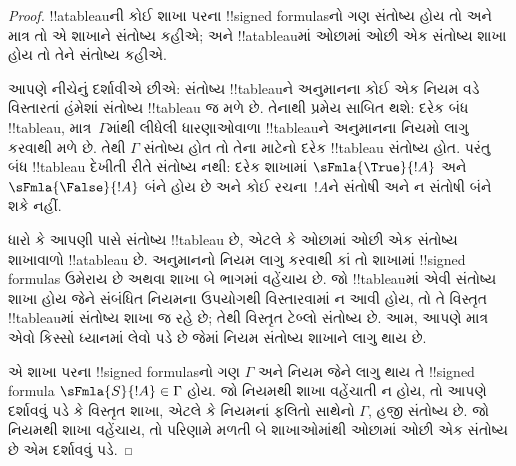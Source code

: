 \documentclass[../../../include/open-logic-section]{subfiles}
\begin{document}
\begin{proof}
!!a{tableau}ની કોઈ શાખા પરના !!{signed formula}sનો ગણ સંતોષ્ય હોય તો
અને માત્ર તો એ શાખાને સંતોષ્ય કહીએ; અને !!a{tableau}માં ઓછામાં ઓછી એક
સંતોષ્ય શાખા હોય તો તેને સંતોષ્ય કહીએ.

આપણે નીચેનું દર્શાવીએ છીએ: સંતોષ્ય !!{tableau}ને અનુમાનના કોઈ એક નિયમ
વડે વિસ્તારતાં હંમેશાં સંતોષ્ય !!{tableau} જ મળે છે. તેનાથી પ્રમેય
સાબિત થશે: દરેક બંધ !!{tableau}, માત્ર~$\Gamma$માંથી લીધેલી ધારણાઓવાળા
!!{tableau}ને અનુમાનના નિયમો લાગુ કરવાથી મળે છે. તેથી $\Gamma$ સંતોષ્ય
હોત તો તેના માટેનો દરેક !!{tableau} સંતોષ્ય હોત. પરંતુ બંધ !!{tableau}
દેખીતી રીતે સંતોષ્ય નથી: દરેક શાખામાં $\sFmla{\True}{!A}$ અને
$\sFmla{\False}{!A}$ બંને હોય છે અને કોઈ રચના~$!A$ને સંતોષી અને ન
સંતોષી બંને શકે નહીં.

ધારો કે આપણી પાસે સંતોષ્ય !!{tableau} છે, એટલે કે ઓછામાં ઓછી એક
સંતોષ્ય શાખાવાળો !!a{tableau} છે. અનુમાનનો નિયમ લાગુ કરવાથી કાં તો
શાખામાં !!{signed formula}s ઉમેરાય છે અથવા શાખા બે ભાગમાં વહેંચાય છે.
જો !!{tableau}માં એવી સંતોષ્ય શાખા હોય જેને સંબંધિત નિયમના ઉપયોગથી
વિસ્તારવામાં ન આવી હોય, તો તે વિસ્તૃત !!{tableau}માં સંતોષ્ય શાખા જ
રહે છે; તેથી વિસ્તૃત ટેબ્લો સંતોષ્ય છે. આમ, આપણે માત્ર એવો કિસ્સો
ધ્યાનમાં લેવો પડે છે જેમાં નિયમ સંતોષ્ય શાખાને લાગુ થાય છે.

એ શાખા પરના !!{signed formula}sનો ગણ $\Gamma$ અને નિયમ જેને લાગુ થાય
તે !!{signed formula} $\sFmla{S}{!A} \in \Gamma$ હોય. જો નિયમથી શાખા
વહેંચાતી ન હોય, તો આપણે દર્શાવવું પડે કે વિસ્તૃત શાખા, એટલે કે નિયમનાં
ફલિતો સાથેનો $\Gamma$, હજી સંતોષ્ય છે. જો નિયમથી શાખા વહેંચાય, તો
પરિણામે મળતી બે શાખાઓમાંથી ઓછામાં ઓછી એક સંતોષ્ય છે એમ દર્શાવવું પડે.


\end{proof}
\end{document}
